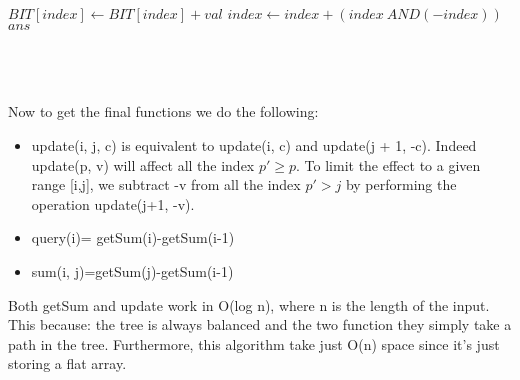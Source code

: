 \documentclass[a4paper]{article}
\begin{document}
\begin{algorithmic}
	\State $BIT[index] \gets BIT[index] +val$
	\State $index \gets index + (index \ AND (-index))$	
\EndWhile
\State \Return $ans$
\EndFunction
\end{algorithmic}
\qquad \\
\\
\\
Now to get the final functions we do the following:
\begin{itemize}
\item update(i, j, c) is equivalent to update(i, c) and update(j + 1, -c). Indeed update(p, v) will affect all the index $p' \geq p$. To limit the effect to a given range [i,j], we subtract -v from all the index $p' > j$ by performing the operation update(j+1, -v).
\item query(i)= getSum(i)-getSum(i-1)
\item sum(i, j)=getSum(j)-getSum(i-1)
\end{itemize} 
Both getSum and update work in O(log n), where n is the length of the input. This because: the tree is always balanced and the two function they simply take a path in the tree. Furthermore, this algorithm take just O(n) space since it's just storing a flat array.
\end{document}
